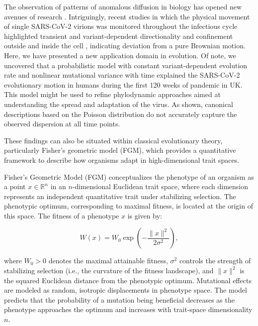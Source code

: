 The observation of patterns of anomalous diffusion in biology has opened new avenues of research \cite{manzo2015}. Intriguingly, recent studies in which the physical movement of single SARS-CoV-2 virions was monitored throughout the infectious cycle highlighted transient and variant-dependent directionality and confinement outside and inside the cell \cite{christie2022, kreutzberger2022}, indicating deviation from a pure Brownian motion. Here, we have presented a new application domain in evolution. Of note, we uncovered that a probabilistic model with constant variant-dependent evolution rate and nonlinear mutational variance with time explained the SARS-CoV-2 evolutionary motion in humans during the first 120 weeks of pandemic in UK. This model might be used to refine phylodynamic approaches aimed at understanding the spread and adaptation of the virus. As shown, canonical descriptions based on the Poisson distribution do not accurately capture the observed dispersion at all time points.

These findings can also be situated within classical evolutionary theory, particularly Fisher's geometric model (FGM), which provides a quantitative framework to describe how organisms adapt in high-dimensional trait spaces.

\begin{definition}
    Fisher's Geometric Model (FGM) conceptualizes the phenotype of an organism as a point $x \in \mathbb{R}^n$ in an $n$-dimensional Euclidean trait space, where each dimension represents an independent quantitative trait under stabilizing selection. The phenotypic optimum, corresponding to maximal fitness, is located at the origin of this space. The fitness of a phenotype $x$ is given by:
    
    \begin{equation}
        W(x) = W_0 \exp\left(-\frac{\|x\|^2}{2\sigma^2}\right),
    \end{equation}
    
    where $W_0 > 0$ denotes the maximal attainable fitness, $\sigma^2$ controls the strength of stabilizing selection (i.e., the curvature of the fitness landscape), and $\|x\|^2$ is the squared Euclidean distance from the phenotypic optimum. Mutational effects are modeled as random, isotropic displacements in phenotype space. The model predicts that the probability of a mutation being beneficial decreases as the phenotype approaches the optimum and increases with trait-space dimensionality $n$.
\end{definition}
    

